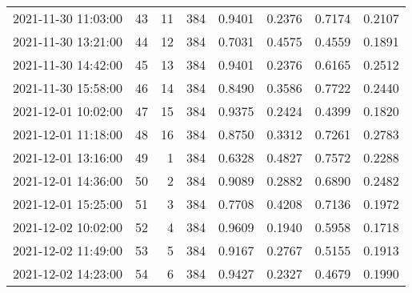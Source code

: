 \begin{longtable}{lrrrrrrr}
2021-11-30 11:03:00 &   43 &   11 &    384 &   0.9401 & 0.2376 & 0.7174 & 0.2107 \\
2021-11-30 13:21:00 &   44 &   12 &    384 &   0.7031 & 0.4575 & 0.4559 & 0.1891 \\
2021-11-30 14:42:00 &   45 &   13 &    384 &   0.9401 & 0.2376 & 0.6165 & 0.2512 \\
2021-11-30 15:58:00 &   46 &   14 &    384 &   0.8490 & 0.3586 & 0.7722 & 0.2440 \\
2021-12-01 10:02:00 &   47 &   15 &    384 &   0.9375 & 0.2424 & 0.4399 & 0.1820 \\
2021-12-01 11:18:00 &   48 &   16 &    384 &   0.8750 & 0.3312 & 0.7261 & 0.2783 \\
2021-12-01 13:16:00 &   49 &    1 &    384 &   0.6328 & 0.4827 & 0.7572 & 0.2288 \\
2021-12-01 14:36:00 &   50 &    2 &    384 &   0.9089 & 0.2882 & 0.6890 & 0.2482 \\
2021-12-01 15:25:00 &   51 &    3 &    384 &   0.7708 & 0.4208 & 0.7136 & 0.1972 \\
2021-12-02 10:02:00 &   52 &    4 &    384 &   0.9609 & 0.1940 & 0.5958 & 0.1718 \\
2021-12-02 11:49:00 &   53 &    5 &    384 &   0.9167 & 0.2767 & 0.5155 & 0.1913 \\
2021-12-02 14:23:00 &   54 &    6 &    384 &   0.9427 & 0.2327 & 0.4679 & 0.1990 \\
\end{longtable}
